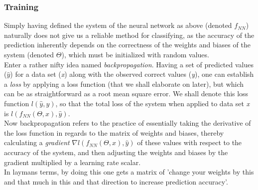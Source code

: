 \subsubsection{Training}
Simply having defined the system of the neural network as above (denoted $f_{NN}$) naturally does not give us a reliable method for classifying, as the accuracy of the prediction inherently depends on the correctness of the weights and biases of the system (denoted $\Theta$), which must be initialized with random values. \\
Enter a rather nifty idea named \textit{backpropagation}. Having a set of predicted values ($\hat{y}$) for a data set (\textit{x}) along with the observed correct values (\textit{y}), one can establish a \textit{loss} by applying a loss function (that we shall elaborate on later), but which can be as straightforward as a root mean square error. We shall denote this loss function $l(\hat{y},y)$, so that the  total loss of the system when applied to data set \textit{x} is $l(f_{NN}(\Theta, x), \hat{y})$.\\
Now backpropagation refers to the practice of essentially taking the derivative of the loss function in regards to the matrix of weights and biases, thereby calculating a \textit{gradient} $\nabla{l(f_{NN}(\Theta, x), \hat{y})}$ of these values with respect to the accuracy of the system, and then adjusting the weights and biases by the gradient multiplied by a learning rate scalar.\\
In laymans terms, by doing this one gets a matrix of 'change your weights by this and that much in this and that direction to increase prediction accuracy'.
%

